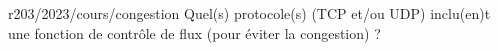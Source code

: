 \begin{question}{r203/2023/cours/congestion}
  Quel(s) protocole(s) (TCP et/ou UDP) inclu(en)t une fonction de
  contrôle de flux (pour éviter la congestion) ?
  \begin{reponses}
  \end{reponses}
\end{question}
